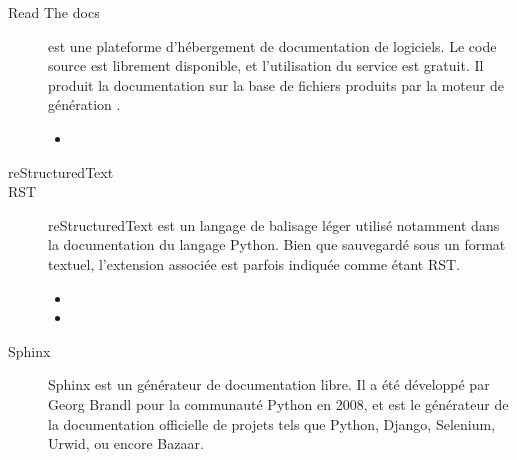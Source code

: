 \documentclass[letterpaper,10pt,french]{sphinxmanual}
\begin{document}
\begin{description}
\item[{Read The docs\label{\detokenize{readthedocs/glossary:term-read-the-docs}}}] \leavevmode
{} est une plateforme d’hébergement de documentation de logiciels. Le code source est librement disponible, et l’utilisation du service est gratuit. Il produit la documentation sur la base de fichiers produits par la moteur de génération {\hyperref[\detokenize{readthedocs/glossary:term-sphinx}]{}}.



\begin{itemize}
\item {} 

\end{itemize}



\item[{reStructuredText\label{\detokenize{readthedocs/glossary:term-restructuredtext}}}] \leavevmode\item[{RST\label{\detokenize{readthedocs/glossary:term-rst}}}] \leavevmode
reStructuredText est un langage de balisage léger utilisé notamment dans la documentation du langage Python. Bien que sauvegardé sous un format textuel, l’extension associée est parfois indiquée comme étant RST.



\begin{itemize}
\item {} 

\item {} 

\end{itemize}



\item[{Sphinx\label{\detokenize{readthedocs/glossary:term-sphinx}}}] \leavevmode
{} Sphinx est un générateur de documentation libre. Il a été développé par Georg Brandl pour la communauté Python en 2008, et est le générateur de la documentation officielle de projets tels que Python, Django, Selenium, Urwid, ou encore Bazaar.



\end{description}
\end{document}
